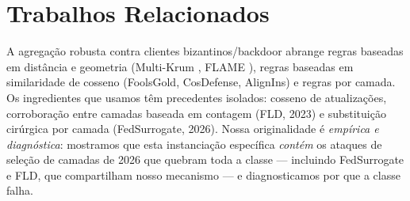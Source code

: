 \section{Trabalhos Relacionados}\label{sec:related}
A agregação robusta contra clientes bizantinos/backdoor abrange regras baseadas em distância e
geometria (Multi-Krum \cite{krum}, FLAME \cite{flame}), regras baseadas em similaridade de
cosseno (FoolsGold, CosDefense, AlignIns) e regras por camada. Os ingredientes que usamos têm
precedentes isolados: cosseno de atualizações, corroboração entre camadas baseada em contagem
(FLD, 2023) e substituição cirúrgica por camada (FedSurrogate, 2026). Nossa originalidade é
\emph{empírica e diagnóstica}: mostramos que esta instanciação específica \emph{contém} os
ataques de seleção de camadas de 2026 que quebram toda a classe --- incluindo FedSurrogate e FLD,
que compartilham nosso mecanismo --- e diagnosticamos por que a classe falha.
